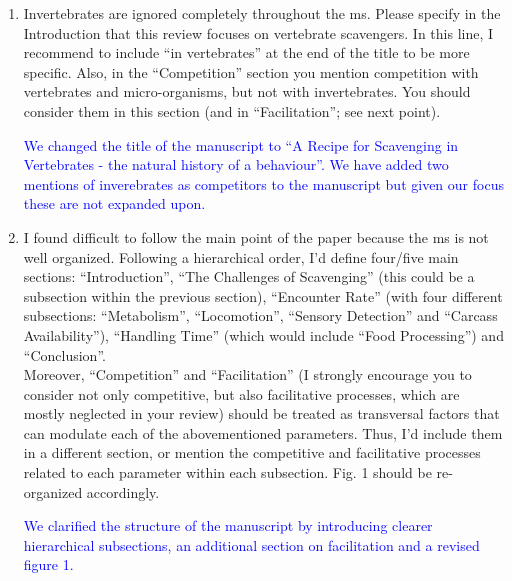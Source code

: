 \documentclass[12pt,letterpaper]{article}
\begin{document}
\begin{enumerate}
\item{Invertebrates are ignored completely throughout the ms.
Please specify in the Introduction that this review focuses on vertebrate scavengers.
In this line, I recommend to include ``in vertebrates'' at the end of the title to be more specific.
Also, in the ``Competition'' section you mention competition with vertebrates and micro-organisms, but not with invertebrates.
You should consider them in this section (and in ``Facilitation''; see next point).}

\textcolor{blue}{We changed the title of the manuscript to ``A Recipe for Scavenging in Vertebrates - the natural history of a behaviour''. We have added two mentions of inverebrates as competitors to the manuscript but given our focus these are not expanded upon.}

\item{I found difficult to follow the main point of the paper because the ms is not well organized. Following a hierarchical order, I'd define four/five main sections: ``Introduction'', ``The Challenges of Scavenging'' (this could be a subsection within the previous section), ``Encounter Rate'' (with four different subsections: ``Metabolism'', ``Locomotion'', ``Sensory Detection'' and ``Carcass Availability''), ``Handling Time'' (which would include ``Food Processing'') and ``Conclusion''. \\ 

Moreover, ``Competition'' and ``Facilitation'' (I strongly encourage you to consider not only competitive, but also facilitative processes, which are mostly neglected in your review) should be treated as transversal factors that can modulate each of the abovementioned parameters. Thus, I'd include them in a different section, or mention the competitive and facilitative processes related to each parameter within each subsection. Fig. 1 should be re-organized accordingly.}

\textcolor{blue}{We clarified the structure of the manuscript by introducing clearer hierarchical subsections, an additional section on facilitation and a revised figure 1.}


\end{enumerate}
\end{document}
